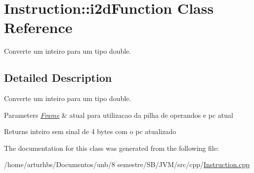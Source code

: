 \hypertarget{classInstruction_1_1i2dFunction}{}\section{Instruction\+:\+:i2d\+Function Class Reference}
\label{classInstruction_1_1i2dFunction}


Converte um inteiro para um tipo double.  




\subsection{Detailed Description}
Converte um inteiro para um tipo double. 


\begin{DoxyParams}{Parameters}
{\em \hyperlink{classFrame}{Frame}} & atual para utilizacao da pilha de operandos e pc atual \\
\hline
\end{DoxyParams}
\begin{DoxyReturn}{Returns}
inteiro sem sinal de 4 bytes com o pc atualizado 
\end{DoxyReturn}


The documentation for this class was generated from the following file\+:\begin{DoxyCompactItemize}
\item 
/home/arturhbs/\+Documentos/unb/8 semestre/\+S\+B/\+J\+V\+M/src/cpp/\hyperlink{Instruction_8cpp}{Instruction.\+cpp}\end{DoxyCompactItemize}
